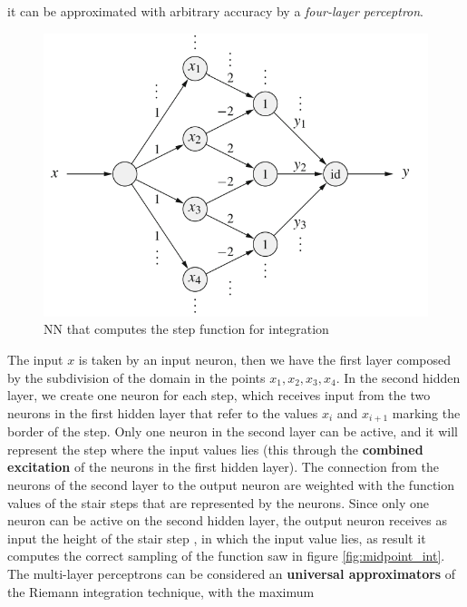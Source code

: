 \documentclass{article}
\begin{document}
it can be approximated with arbitrary accuracy by a \textit{four-layer perceptron}.
\begin{figure}[H]
    \centering
    \includegraphics[scale=0.5]{images/integra_perceptron.png}
    \caption{NN that computes the step function for integration}
\end{figure}
The input $x$ is taken by an input neuron, then we have the first
layer composed by the subdivision of the domain in the points
$x_1, x_2, x_3,x_4$.
In the second hidden layer, we create one neuron for each step,
which receives input from the two neurons in the first hidden layer that
refer to the values $x_i$ and $x_{i+1}$ marking the border of the step.
Only one neuron in the second layer can be active, and it will represent
the step where the input values lies (this through the \textbf{combined
    excitation} of the neurons in the first hidden layer).
\newline\newline
The connection from the neurons of the second layer to the output
neuron are weighted with the function values of the stair steps that
are represented by the neurons.
\newline\newline
Since only one neuron can be active on the second hidden layer, the
output neuron receives as input the height of the stair step , in which
the input value lies, as result it computes the correct sampling
of the function saw in figure \ref{fig:midpoint_int}.
\newline\newline
The multi-layer perceptrons can be considered an \textbf{universal
    approximators} of the Riemann integration technique, with the maximum
\end{document}
